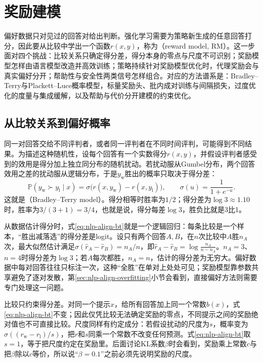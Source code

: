 \section{奖励建模}
\label{sec:nlp-align-signals}

偏好数据只对见过的回答对给出判断。强化学习需要为策略新生成的任意回答打分，因此要从比较中学出一个函数$r(x,y)$，称为（reward model, RM）。这一步面对四个挑战：比较关系只确定得分差，得分本身的零点与尺度不可识别；奖励模型怎样由语言模型改造并高效训练；策略持续针对奖励模型优化时，代理奖励会与真实偏好分开；帮助性与安全性两类信号怎样组合。对应的方法谱系是：Bradley--Terry与Plackett--Luce概率模型，标量奖励头、批内成对训练与间隔损失，过度优化的度量与集成缓解，以及帮助与代价分开建模的约束优化。

\subsection{从比较关系到偏好概率}
\label{sec:nlp-align-bradley-terry}

同一对回答交给不同评判者，或者同一评判者在不同时间评判，可能得到不同结果。为描述这种随机性，设每个回答有一个实数得分$r(x,y)$，并假设评判者感受到的效用是得分加上独立同分布的随机扰动。若扰动服从Gumbel分布，两个回答效用之差的扰动服从逻辑分布，于是$y_{\mathrm w}$胜出的概率只取决于得分差：
\begin{equation}
\label{eq:nlp-align-bt}
 \mathbb{P}(y_{\mathrm w}\succ y_{\mathrm l}\mid x)
 =\sigma\bigl(r(x,y_{\mathrm w})-r(x,y_{\mathrm l})\bigr),\qquad
 \sigma(u)=\frac{1}{1+e^{-u}}.
\end{equation}
这就是（Bradley--Terry model）。得分相等时胜率为$1/2$；得分差为$\log 3\approx1.10$时，胜率为$3/(3+1)=3/4$，也就是说，得分每差$\log3$，胜负比就是3比1。

从数据估计得分时，式\eqref{eq:nlp-align-bt}就是一个逻辑回归：每条比较是一个样本，“胜出减落选”的得分差是logit。设只有两个回答$A,B$，在$n$次比较中$A$胜$n_A$次，最大似然估计满足$\sigma(\hat r_A-\hat r_B)=n_A/n$，即$\hat r_A-\hat r_B=\log\frac{n_A}{n-n_A}$。$n_A=3$、$n=4$时得分差为$\log3$；若$A$每次都胜，$n_A=n$，估计的得分差为无穷大。偏好数据中每对回答往往只标注一次，这种“全胜”在单对上处处可见；奖励模型靠参数共享避免了逐对发散，第\ref{sec:nlp-align-overfitting}小节会看到，直接偏好方法则需要专门处理这一问题。

比较只约束得分差。对同一个提示$x$，给所有回答加上同一个常数$b(x)$，式\eqref{eq:nlp-align-bt}不变；因此仅凭比较无法确定奖励的零点，不同提示之间的奖励绝对值也不可直接比较。尺度同样有约定成分：若假设扰动的尺度为$s$，概率变为$\sigma((r_{\mathrm w}-r_{\mathrm l})/s)$，把$r$和$s$同乘一个常数不改变任何预测。式\eqref{eq:nlp-align-bt}取$s=1$，等于把尺度约定在奖励里。后面讨论KL系数$\beta$时会看到，奖励乘上常数$c$与把$\beta$除以$c$等价，所以说“$\beta=0.1$”之前必须先说明奖励的尺度。

